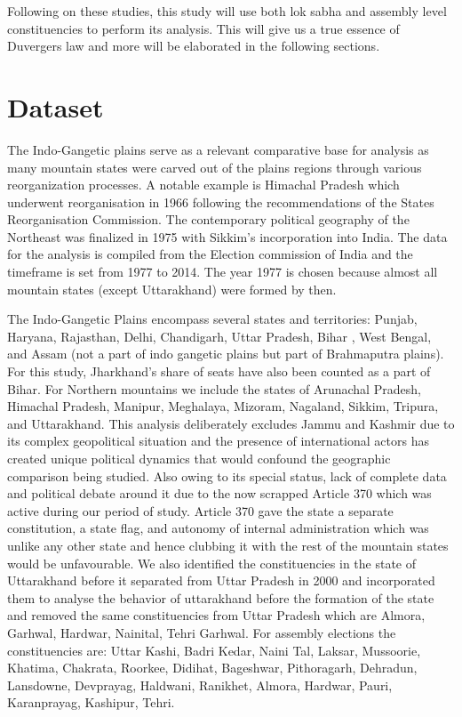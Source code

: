\vspace{0.3cm}


Following on these studies, this study will use both lok sabha and assembly level constituencies to perform its analysis. This will give us a true essence of Duvergers law and more will be elaborated in the following sections.

\section{Dataset}

The Indo-Gangetic plains serve as a relevant comparative base for analysis as many mountain states were carved out of the plains regions through various reorganization processes. A notable example is Himachal Pradesh which underwent reorganisation in 1966 following the recommendations of the States Reorganisation Commission. The contemporary political geography of the Northeast was finalized in 1975 with Sikkim's incorporation into India. The data for the analysis is compiled from the Election commission of India and the timeframe is set from 1977 to 2014. The year 1977 is chosen because almost all mountain states (except Uttarakhand) were formed by then. 

\vspace{0.3cm} 

The Indo-Gangetic Plains encompass several states and territories: Punjab, Haryana, Rajasthan, Delhi, Chandigarh, Uttar Pradesh, Bihar , West Bengal, and Assam (not a part of indo gangetic plains but part of Brahmaputra plains). For this study,  Jharkhand's share of seats have also been counted as a part of Bihar. For Northern mountains we include the states of Arunachal Pradesh, Himachal Pradesh, Manipur, Meghalaya, Mizoram, Nagaland, Sikkim, Tripura, and Uttarakhand. This analysis deliberately excludes Jammu and Kashmir due to its complex geopolitical situation and the presence of international actors has created unique political dynamics that would confound the geographic comparison being studied. Also owing to its special status, lack of complete data and political debate around it due to the now scrapped Article 370 which was active during our period of study. Article 370 gave the state a separate constitution, a state flag, and autonomy of internal administration which was unlike any other state and hence clubbing it with the rest of the mountain states would be unfavourable. We also identified the constituencies in the state of Uttarakhand before it separated from Uttar Pradesh in 2000 and incorporated them to analyse the behavior of uttarakhand before the formation of the state and removed the same constituencies from Uttar Pradesh which are Almora, Garhwal, Hardwar, Nainital, Tehri Garhwal. For assembly elections the constituencies are: Uttar Kashi, Badri Kedar, Naini Tal, Laksar, Mussoorie, Khatima, Chakrata, Roorkee, Didihat, Bageshwar, Pithoragarh, Dehradun, Lansdowne, Devprayag, Haldwani, Ranikhet, Almora, Hardwar, Pauri, Karanprayag, Kashipur, Tehri.

